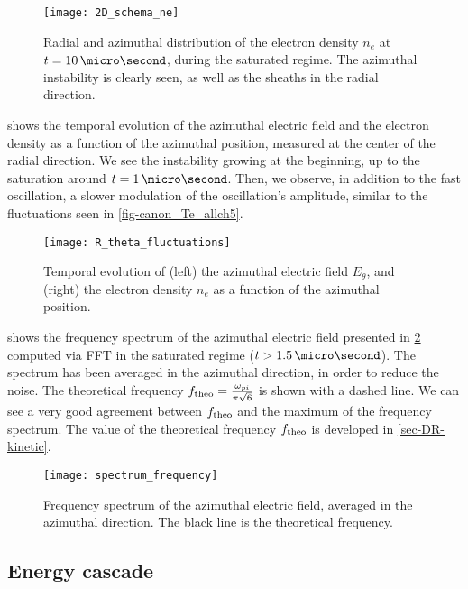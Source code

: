   \begin{figure}[hbtp]
    \centering
    \texttt{[image: 2D\_schema\_ne]}
    \caption{Radial and azimuthal distribution of the electron density $n_e$ at $t=10\,\micro\second$, during the saturated regime. The azimuthal instability is clearly seen, as well as the sheaths in the radial direction. }
    \label{fig-2D_ne}
  \end{figure}
  
   shows the temporal evolution of the azimuthal electric field and the electron density as a function of the azimuthal position, measured at the center of the radial direction.
  We see the instability growing at the beginning, up to the saturation around $t=1\,\micro\second$.
  Then, we observe, in addition to the fast oscillation, a slower modulation of the oscillation's amplitude, similar to the fluctuations seen in \cref{fig-canon_Te_allch5}.
  \begin{figure}[!hbt]
    \centering
    \texttt{[image: R\_theta\_fluctuations]}
    \caption{Temporal evolution of (left) the azimuthal electric field $E_{\theta}$, and (right) the electron density $n_e$ as a function of the azimuthal position.}
    \label{fig-2DcutEx}
  \end{figure}

   shows the frequency spectrum of the azimuthal electric field presented in \cref{fig-2DcutEx} computed via \ac{FFT} in the saturated regime ($t > 1.5\,\micro\second$).
  The spectrum has been averaged in the azimuthal direction, in order to reduce the noise.
  The theoretical frequency $f_{\rm theo} = \frac{\omega_{pi}}{\pi \sqrt{6} }$ \citep{croes2018} is shown with a dashed line. 
  We can see a very good agreement between $f_{\rm theo}$ and the maximum of the frequency spectrum.
  The value of the theoretical frequency $f_{\rm theo}$ is developed in \cref{sec-DR-kinetic}.
  \begin{figure}[!hbt]
    \centering
    \texttt{[image: spectrum\_frequency]}
    \caption{Frequency spectrum of the azimuthal electric field, averaged in the azimuthal direction. The black line is the theoretical frequency.}
    \label{fig-FFT_ex}
  \end{figure}
  
  \subsection{Energy cascade} \label{subsec-turbul}
  
